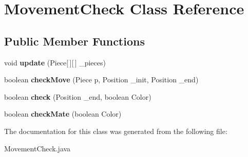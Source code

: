 \hypertarget{class_movement_check}{\section{Movement\-Check Class Reference}
\label{class_movement_check}
}
\subsection*{Public Member Functions}
\begin{DoxyCompactItemize}
\item 
\hypertarget{class_movement_check_ad4282505567223574aad557238ec3962}{void {\bfseries update} (Piece\mbox{[}$\,$\mbox{]}\mbox{[}$\,$\mbox{]} \-\_\-pieces)}\label{class_movement_check_ad4282505567223574aad557238ec3962}

\item 
\hypertarget{class_movement_check_a7de16c5e5e34bea53f45a84c0357b3cf}{boolean {\bfseries check\-Move} (Piece p, Position \-\_\-init, Position \-\_\-end)}\label{class_movement_check_a7de16c5e5e34bea53f45a84c0357b3cf}

\item 
\hypertarget{class_movement_check_a419c5a5eba3dd02a9a9d0fe56df331b9}{boolean {\bfseries check} (Position \-\_\-end, boolean Color)}\label{class_movement_check_a419c5a5eba3dd02a9a9d0fe56df331b9}

\item 
\hypertarget{class_movement_check_a6f044b7c75dd4d54dc1253937e885c6a}{boolean {\bfseries check\-Mate} (boolean Color)}\label{class_movement_check_a6f044b7c75dd4d54dc1253937e885c6a}

\end{DoxyCompactItemize}


The documentation for this class was generated from the following file\-:\begin{DoxyCompactItemize}
\item 
Movement\-Check.\-java\end{DoxyCompactItemize}
